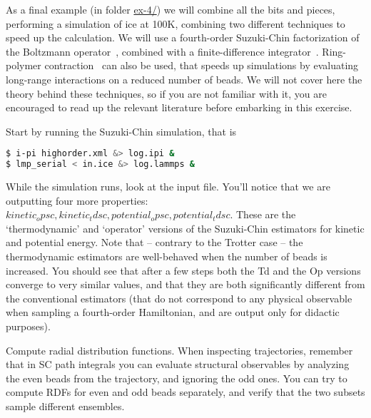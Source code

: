 \documentclass{article}
\begin{document}
\begin{Exercise}[label={sc-all},title={Doing PIMD Like a Pro}]
As a final example (in folder \url{ex-4/}) we will combine all the bits and pieces, performing
a simulation of ice at 100K, combining two different techniques to speed up
the calculation. We will use a fourth-order Suzuki-Chin factorization of
the Boltzmann operator~\cite{suzu95pla,chin97pla}, combined with a finite-difference
integrator~\cite{kapi+16}. Ring-polymer contraction~\cite{mark-mano08jcp} 
can also be used, that speeds up simulations by evaluating long-range interactions 
on a reduced number of beads.
We will not cover here the theory behind these techniques, 
so if you are not familiar with it, you are encouraged to read up the relevant 
literature before embarking in this exercise.

\Question Start by running the Suzuki-Chin simulation, that is
\begin{lstlisting}[language=bash]
$ i-pi highorder.xml &> log.ipi &
$ lmp_serial < in.ice &> log.lammps &
\end{lstlisting}
While the simulation runs, look at the input file. You'll notice
that we are outputting four more properties: 
\lstinxml$kinetic_opsc, kinetic_tdsc, potential_opsc, potential_tdsc$. These
are the `thermodynamic' and `operator' versions of the Suzuki-Chin estimators
for kinetic and potential energy. Note that -- contrary to the Trotter case --
the thermodynamic estimators are well-behaved when the number of beads is 
increased. You should see that after a few steps both the Td and the Op 
versions converge to very similar values, and that they are both significantly
different from the conventional estimators (that do not correspond to any
physical observable when sampling a fourth-order Hamiltonian, and are output
only for didactic purposes). 

\Question Compute radial distribution functions. 
When inspecting trajectories,  remember that in SC path integrals you can 
evaluate structural observables by analyzing the even beads from the trajectory,
and ignoring the odd ones. You can try to compute RDFs for even and odd beads
separately, and verify that the two subsets sample different ensembles. 


\end{Exercise}
\end{document}
